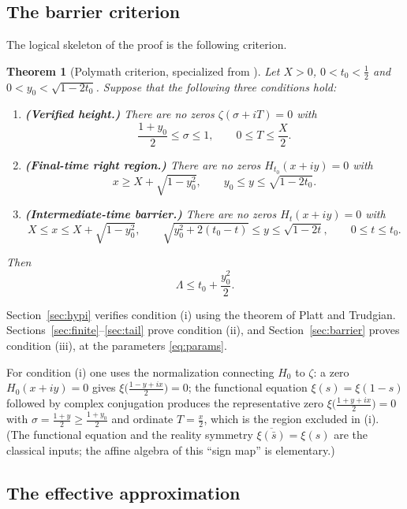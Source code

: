 \documentclass[11pt]{article}
\newtheorem{theorem}{Theorem}[section]
\theoremstyle{definition}
\newcommand{\LB}{\Lambda}
\begin{document}
\subsection{The barrier criterion}

The logical skeleton of the proof is the following criterion.

\begin{theorem}[{Polymath criterion, specialized from
\cite[Theorem~1.2]{Polymath}}]\label{thm:criterion}
Let $X>0$, $0<t_0<\tfrac12$ and
$0<y_0<\sqrt{1-2t_0}$. Suppose that the following three conditions hold:
\begin{enumerate}
\item[\textup{(i)}] \textbf{(Verified height.)} There are no zeros
$\zeta(\sigma+iT)=0$ with
\[
\frac{1+y_0}{2}\le\sigma\le1,\qquad 0\le T\le\frac X2 .
\]
\item[\textup{(ii)}] \textbf{(Final-time right region.)} There are no
zeros $H_{t_0}(x+iy)=0$ with
\[
x\ge X+\sqrt{1-y_0^2},\qquad y_0\le y\le\sqrt{1-2t_0}.
\]
\item[\textup{(iii)}] \textbf{(Intermediate-time barrier.)} There are
no zeros $H_t(x+iy)=0$ with
\[
X\le x\le X+\sqrt{1-y_0^2},\qquad
\sqrt{y_0^2+2(t_0-t)}\le y\le\sqrt{1-2t},\qquad
0\le t\le t_0 .
\]
\end{enumerate}
Then
\[
\LB\le t_0+\frac{y_0^2}{2}.
\]
\end{theorem}

Section~\ref{sec:hypi} verifies condition (i) using the theorem of Platt and
Trudgian. Sections~\ref{sec:finite}--\ref{sec:tail} prove condition (ii), and
Section~\ref{sec:barrier} proves condition (iii), at the parameters
\eqref{eq:params}.

For condition (i) one uses the normalization connecting $H_0$ to
$\zeta$: a zero $H_0(x+iy)=0$ gives
$\xi\bigl(\frac{1-y+ix}{2}\bigr)=0$; the functional equation
$\xi(s)=\xi(1-s)$ followed by complex conjugation produces the
representative zero $\xi\bigl(\frac{1+y+ix}{2}\bigr)=0$ with
$\sigma=\frac{1+y}2\ge\frac{1+y_0}2$ and ordinate $T=\frac x2$, which
is the region excluded in (i). (The functional equation and the
reality symmetry $\overline{\xi(\bar s)}=\xi(s)$ are the classical
inputs; the affine algebra of this ``sign map'' is elementary.)

\subsection{The effective approximation}\label{sec:thm13}
\end{document}
